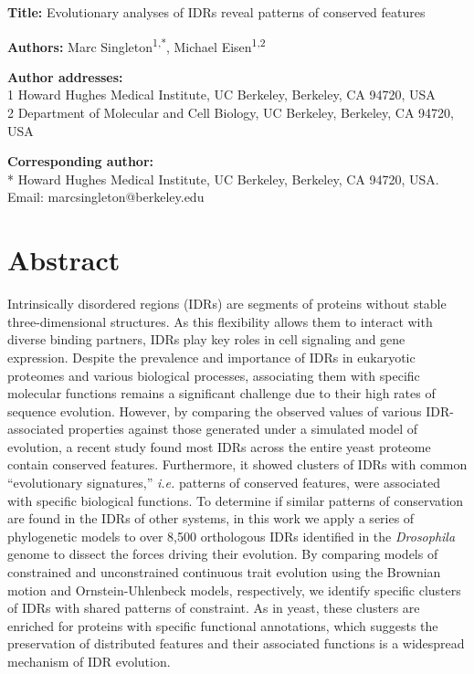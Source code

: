 \textbf{Title:} Evolutionary analyses of IDRs reveal patterns of conserved features

\textbf{Authors:} Marc Singleton\textsuperscript{1,*}, Michael Eisen\textsuperscript{1,2}

\textbf{Author addresses:}\\
1 Howard Hughes Medical Institute, UC Berkeley, Berkeley, CA 94720, USA\\
2 Department of Molecular and Cell Biology, UC Berkeley, Berkeley, CA 94720, USA

\textbf{Corresponding author:}\\
* Howard Hughes Medical Institute, UC Berkeley, Berkeley, CA 94720, USA. Email: marcsingleton@berkeley.edu

\clearpage

\section{Abstract}
Intrinsically disordered regions (IDRs) are segments of proteins without stable three-dimensional structures. As this flexibility allows them to interact with diverse binding partners, IDRs play key roles in cell signaling and gene expression. Despite the prevalence and importance of IDRs in eukaryotic proteomes and various biological processes, associating them with specific molecular functions remains a significant challenge due to their high rates of sequence evolution. However, by comparing the observed values of various IDR-associated properties against those generated under a simulated model of evolution, a recent study found most IDRs across the entire yeast proteome contain conserved features. Furthermore, it showed clusters of IDRs with common ``evolutionary signatures,'' \textit{i.e.} patterns of conserved features, were associated with specific biological functions. To determine if similar patterns of conservation are found in the IDRs of other systems, in this work we apply a series of phylogenetic models to over 8,500 orthologous IDRs identified in the \textit{Drosophila} genome to dissect the forces driving their evolution. By comparing models of constrained and unconstrained continuous trait evolution using the Brownian motion and Ornstein-Uhlenbeck models, respectively, we identify specific clusters of IDRs with shared patterns of constraint. As in yeast, these clusters are enriched for proteins with specific functional annotations, which suggests the preservation of distributed features and their associated functions is a widespread mechanism of IDR evolution.

